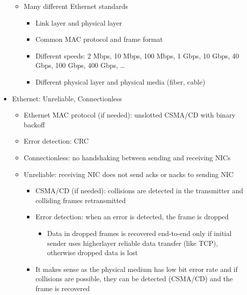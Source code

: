 \begin{itemize}
\begin{itemize}
      \item Many different Ethernet standards

        \begin{itemize}

          \item Link layer and physical layer

          \item Common MAC protocol and frame format

          \item Different speeds: 2 Mbps, 10 Mbps, 100 Mbps, 1 Gbps, 10 Gbps, 40 Gbps, 100 Gbps, 400 Gbps, \ldots

          \item Different physical layer and physical media (fiber, cable)

        \end{itemize}

    \end{itemize}

  \item Ethernet: Unreliable, Connectionless

    \begin{itemize}

      \item Ethernet MAC protocol (if needed): unslotted CSMA/CD with binary backoff

      \item Error detection: CRC

      \item Connectionless: no handshaking between sending and receiving NICs

      \item Unreliable: receiving NIC does not send acks or nacks to sending NIC

        \begin{itemize}

          \item CSMA/CD (if needed): collisions are detected in the transmitter and colliding frames retransmitted

          \item Error detection: when an error is detected, the frame is dropped

            \begin{itemize}

              \item Data in dropped frames is recovered end-to-end only if initial sender uses higherlayer reliable data transfer (like TCP), otherwise dropped data is lost

            \end{itemize}

          \item It makes sense as the physical medium has low bit error rate and if collisions are possible, they can be detected (CSMA/CD) and the frame is recovered

        \end{itemize}

    \end{itemize}

\end{itemize}



